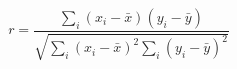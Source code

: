 \documentclass[preview,border=4pt]{standalone}
\begin{document}
\begin{equation}
r = \frac{\sum_i (x_i - \bar{x})(y_i - \bar{y})}{\sqrt{\sum_i (x_i-\bar{x})^2 \sum_i (y_i-\bar{y})^2}}
\end{equation}
\end{document}
